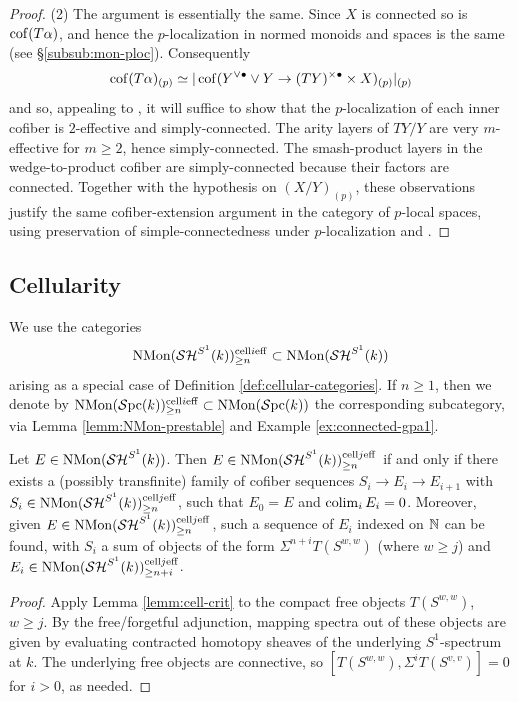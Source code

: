 \documentclass{amsart}
\numberwithin{proposition}{section}
\numberwithin{equation}{section}
\def\cell{\mathrm{cell}}
\def\NMon{\mathrm{NMon}}
\begin{document}
\begin{proof}
(2) The argument is essentially the same.
Since $X$ is connected so is $\operatorname{cof}(T\alpha)$, and hence the $p$-localization in normed monoids and spaces is the same (see \S\ref{subsub:mon-ploc}).
Consequently \[ \operatorname{cof}(T\alpha)_{(p)} \simeq |\operatorname{cof}(Y^{\vee \bullet} \vee Y \to (TY)^{\times \bullet} \times X)_{(p)}|_{(p)} \] and so, appealing to \cite[Proposition 4.3.4]{freudenthal}, it will suffice to show that the $p$-localization of each inner cofiber is $2$-effective and simply-connected.
The arity layers of $TY/Y$ are very $m$-effective for $m \ge 2$, hence simply-connected.
The smash-product layers in the wedge-to-product cofiber are simply-connected because their factors are connected.
Together with the hypothesis on $(X/Y)_{(p)}$, these observations justify the same cofiber-extension argument in the category of $p$-local spaces, using preservation of simple-connectedness under $p$-localization and \cite[Proposition 4.3.4]{freudenthal}.
\end{proof}

\subsection{Cellularity}
We use the categories \[ \NMon(\SH^{S^1}(k))^{\cell i \eff}_{\ge n} \subset \NMon(\SH^{S^1}(k)) \] arising as a special case of Definition \ref{def:cellular-categories}.
If $n \ge 1$, then we denote by $\NMon(\Spc(k))^{\cell i \eff}_{\ge n} \subset \NMon(\Spc(k))$ the corresponding subcategory, via Lemma \ref{lemm:NMon-prestable} and Example \ref{ex:connected-gpa1}.

\begin{corollary} \label{cor:NMon-cell-crit}
Let $E \in \NMon(\SH^{S^1}(k))$.
Then $E \in \NMon(\SH^{S^1}(k))^{\cell j \eff}_{\ge n}$ if and only if there exists a (possibly transfinite) family of cofiber sequences $S_i \to E_i \to E_{i+1}$ with $S_i \in \NMon(\SH^{S^1}(k))^{\cell j \eff}_{\ge n}$, such that $E_0=E$ and $\operatorname*{colim}_i E_i=0$.
Moreover, given $E \in \NMon(\SH^{S^1}(k))^{\cell j \eff}_{\ge n}$, such a sequence of $E_i$ indexed on $\mathbb{N}$ can be found, with $S_i$ a sum of objects of the form $\Sigma^{n+i}T(S^{w,w})$ (where $w\ge j$) and $E_i \in \NMon(\SH^{S^1}(k))^{\cell j \eff}_{\ge n+i}$.
\end{corollary}
\begin{proof}
Apply Lemma \ref{lemm:cell-crit} to the compact free objects $T(S^{w,w})$, $w\ge j$.
By the free/forgetful adjunction, mapping spectra out of these objects are given by evaluating contracted homotopy sheaves of the underlying $S^1$-spectrum at $k$.
The underlying free objects are connective, so $[T(S^{w,w}),\Sigma^iT(S^{v,v})]=0$ for $i>0$, as needed.
\end{proof}
\end{document}
